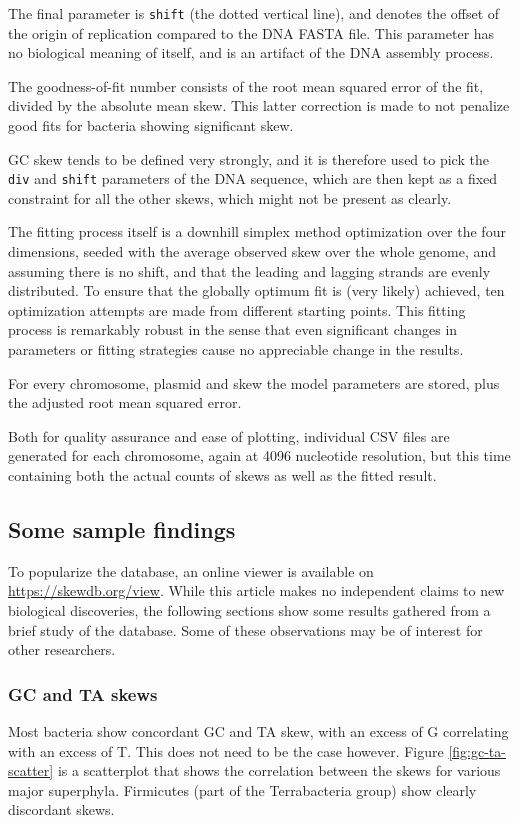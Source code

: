 \documentclass[fleqn,10pt]{wlscirep}
\begin{document}
The final parameter is {\tt shift} (the dotted vertical line), and denotes the offset of the origin of replication compared to the DNA FASTA file. This parameter has no biological meaning of  itself, and is an artifact of the DNA assembly process. 

The goodness-of-fit number consists of the root mean squared error of the fit, divided by the absolute mean skew. This latter correction is made to not penalize good fits for bacteria showing significant skew.

GC skew tends to be defined very strongly, and it is therefore used to pick the {\tt div} and {\tt shift} parameters of the DNA sequence, which are then kept as a fixed constraint for all the other skews, which might not be present as clearly.

The fitting process itself is a downhill simplex method optimization\cite{Nelder1965} over the four dimensions, seeded with the average observed skew over the whole genome, and assuming there is no shift, and that the leading and lagging strands are evenly distributed. To ensure that the globally optimum fit is (very likely) achieved, ten optimization attempts are made from different starting points. This fitting process is remarkably robust in the sense that even significant changes in parameters or fitting strategies cause no appreciable change in the results. 

For every chromosome, plasmid and skew the model parameters are stored, plus the adjusted root mean squared error.

Both for quality assurance and ease of plotting, individual CSV files are generated for each chromosome, again at 4096 nucleotide resolution, but this time containing both the actual counts of skews as well as the fitted result.
  
\subsection*{Some sample findings}
To popularize the database, an online viewer is available on \url{https://skewdb.org/view}. While this article makes no independent claims to new biological discoveries, the following sections show some results gathered from a brief study of the database. Some of these observations may be of interest for other researchers.
\subsubsection*{GC and TA skews}
Most bacteria show concordant GC and TA skew, with an excess of G correlating with an excess of T. This does not need to be the case however. Figure \ref{fig:gc-ta-scatter} is a scatterplot that shows the correlation between the skews for various major superphyla. Firmicutes (part of the Terrabacteria group) show clearly discordant skews.
\end{document}
